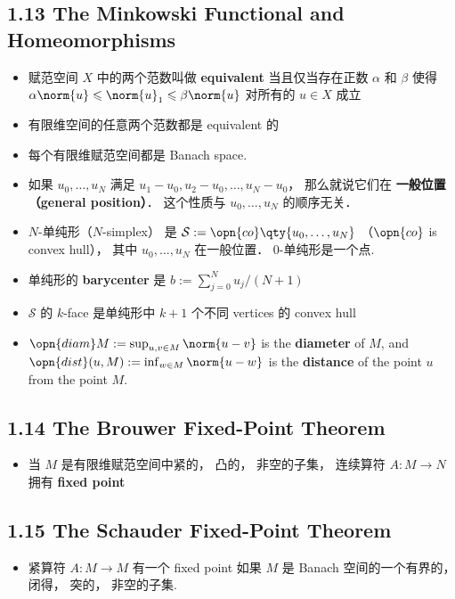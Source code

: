 \subsection{1.13 The Minkowski Functional and Homeomorphisms}
\begin{itemize}
\item 赋范空间 $X$ 中的两个范数叫做 \textbf{equivalent} 当且仅当存在正数 $\alpha$ 和 $\beta$ 使得 $\alpha \norm{u} \leqslant \norm{u}_1 \leqslant \beta \norm{u}$ 对所有的 $u \in X$ 成立

\item 有限维空间的任意两个范数都是 equivalent 的

\item 每个有限维赋范空间都是 Banach space.

\item 如果 $u_0, \dots, u_N$  满足 $u_1 - u_0, u_2 - u_0,\dots, u_N - u_0$， 那么就说它们在 \textbf{一般位置（general position）}． 这个性质与 $u_0, \dots, u_N$ 的顺序无关．

\item $N$-单纯形（$N$-simplex） 是 $\mathcal S := \opn{co}\qty{u_0, \dots, u_N}$ （$\opn{co}$ is convex hull）， 其中 $u_0, \dots, u_N$ 在一般位置． $0$-单纯形是一个点.

\item 单纯形的 \textbf{barycenter} 是 $b := \sum_{j=0}^N u_j / (N+1)$

\item $\mathcal S$ 的 $k$-face 是单纯形中 $k+1$ 个不同 vertices 的 convex hull

\item $\opn{diam} M := \sup_{u, v\in M} \norm{u - v}$ is the \textbf{diameter} of $M$, and $\opn{dist}(u, M) := \inf_{w \in M} \norm{u - w}$ is the \textbf{distance} of the point $u$ from the point $M$.
\end{itemize}

\subsection{1.14 The Brouwer Fixed-Point Theorem}

\begin{itemize}
\item 当 $M$ 是有限维赋范空间中紧的， 凸的， 非空的子集， 连续算符 $A: M \to N$ 拥有 \textbf{fixed point}
\end{itemize}

\subsection{1.15 The Schauder Fixed-Point Theorem}
\begin{itemize}
\item 紧算符 $A: M \to M$ 有一个 fixed point 如果 $M$ 是 Banach 空间的一个有界的， 闭得， 突的， 非空的子集.
\end{itemize}

